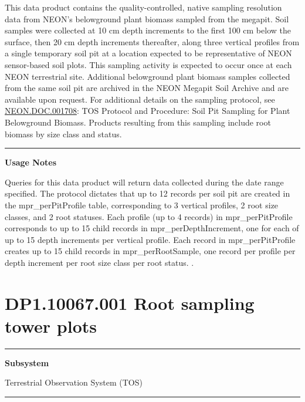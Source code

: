 \documentclass[]{article}
\begin{document}
This data product contains the quality-controlled, native sampling
resolution data from NEON's belowground plant biomass sampled from the
megapit. Soil samples were collected at 10 cm depth increments to the
first 100 cm below the surface, then 20 cm depth increments thereafter,
along three vertical profiles from a single temporary soil pit at a
location expected to be representative of NEON sensor-based soil plots.
This sampling activity is expected to occur once at each NEON
terrestrial site. Additional belowground plant biomass samples collected
from the same soil pit are archived in the NEON Megapit Soil Archive and
are available upon request. For additional details on the sampling
protocol, see
\href{http://data.neonscience.org/api/v0/documents/NEON.DOC.001708vA}{NEON.DOC.001708}:
TOS Protocol and Procedure: Soil Pit Sampling for Plant Belowground
Biomass. Products resulting from this sampling include root biomass by
size class and status.

\begin{center}\rule{0.5\linewidth}{\linethickness}\end{center}

\textbf{Usage Notes}

Queries for this data product will return data collected during the date
range specified. The protocol dictates that up to 12 records per soil
pit are created in the mpr\_perPitProfile table, corresponding to 3
vertical profiles, 2 root size classes, and 2 root statuses. Each
profile (up to 4 records) in mpr\_perPitProfile corresponds to up to 15
child records in mpr\_perDepthIncrement, one for each of up to 15 depth
increments per vertical profile. Each record in mpr\_perPitProfile
creates up to 15 child records in mpr\_perRootSample, one record per
profile per depth increment per root size class per root status.
\newpage
.

\section{DP1.10067.001 Root sampling tower
plots}\label{dp1.10067.001-root-sampling-tower-plots}

\begin{center}\rule{0.5\linewidth}{\linethickness}\end{center}

\textbf{Subsystem}

Terrestrial Observation System (TOS)

\begin{center}\rule{0.5\linewidth}{\linethickness}\end{center}
\end{document}
